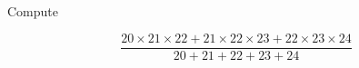 Compute

$$\dfrac{20\times 21\times 22+21\times 22\times 23+22\times 23\times 24}{20+21+22+23+24}$$
